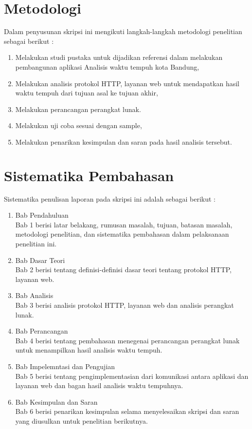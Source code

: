 \section{Metodologi}
\label{sec:metlit}
Dalam penyusunan skripsi ini mengikuti langkah-langkah metodologi penelitian sebagai berikut :
\begin{enumerate}
	\item Melakukan studi pustaka untuk dijadikan referensi dalam melakukan pembangunan aplikasi Analisis waktu tempuh kota Bandung,
	\item Melakukan analisis protokol HTTP, layanan web untuk mendapatkan hasil waktu tempuh dari tujuan asal ke tujuan akhir,
	\item Melakukan perancangan perangkat lunak.
	\item Melakukan uji coba sesuai dengan sample,
	\item Melakukan penarikan kesimpulan dan saran pada hasil analisis tersebut.
\end{enumerate}


\section{Sistematika Pembahasan}
\label{sec:sispem}
Sistematika penulisan laporan pada skripsi ini adalah sebagai berikut :
\begin{enumerate}
	\item Bab Pendahuluan\\
	Bab 1 berisi latar belakang, rumusan masalah, tujuan, batasan masalah, metodologi penelitian, dan sistematika pembahasan dalam pelaksanaan penelitian ini.
	\item Bab Dasar Teori\\
	Bab 2 berisi tentang definisi-definisi dasar teori tentang protokol HTTP, layanan web.
	\item Bab Analisis\\
	Bab 3 berisi analisis protokol HTTP, layanan web dan analisis perangkat lunak.
	\item Bab Perancangan\\
	Bab 4 berisi tentang pembahasan menegenai perancangan perangkat lunak untuk menampilkan hasil analisis waktu tempuh.
	\item Bab Impelemntasi dan Pengujian\\
	Bab 5 berisi tentang pengimplementasian dari komunikasi antara aplikasi dan layanan web dan bagan hasil analisis waktu tempuhnya.
	\item Bab Kesimpulan dan Saran\\
	Bab 6 berisi penarikan kesimpulan selama menyelesaikan skripsi dan saran yang diusulkan untuk penelitian berikutnya.
\end{enumerate}